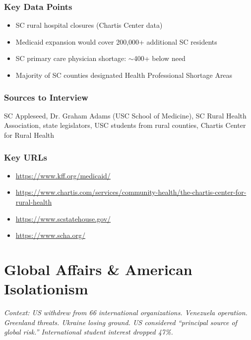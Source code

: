 \documentclass[11pt,letterpaper]{article}
\begin{document}
\subsubsection*{Key Data Points}
\begin{itemize}[noitemsep]
    \item SC rural hospital closures (Chartis Center data)
    \item Medicaid expansion would cover 200,000+ additional SC residents
    \item SC primary care physician shortage: $\sim$400+ below need
    \item Majority of SC counties designated Health Professional Shortage Areas
\end{itemize}

\subsubsection*{Sources to Interview}
SC Appleseed, Dr. Graham Adams (USC School of Medicine), SC Rural Health Association, state legislators, USC students from rural counties, Chartis Center for Rural Health

\subsubsection*{Key URLs}
\begin{itemize}[noitemsep]
    \item \url{https://www.kff.org/medicaid/}
    \item \url{https://www.chartis.com/services/community-health/the-chartis-center-for-rural-health}
    \item \url{https://www.scstatehouse.gov/}
    \item \url{https://www.scha.org/}
\end{itemize}

\newpage
\section{Global Affairs \& American Isolationism}

\textit{Context: US withdrew from 66 international organizations. Venezuela operation. Greenland threats. Ukraine losing ground. US considered ``principal source of global risk.'' International student interest dropped 47\%.}
\end{document}
